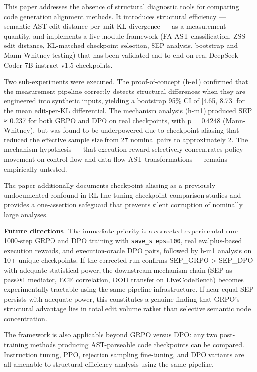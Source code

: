 
This paper addresses the absence of structural diagnostic tools for comparing code generation alignment methods. It introduces structural efficiency — semantic AST edit distance per unit KL divergence — as a measurement quantity, and implements a five-module framework (FA-AST classification, ZSS edit distance, KL-matched checkpoint selection, SEP analysis, bootstrap and Mann-Whitney testing) that has been validated end-to-end on real DeepSeek-Coder-7B-instruct-v1.5 checkpoints.

Two sub-experiments were executed. The proof-of-concept (h-e1) confirmed that the measurement pipeline correctly detects structural differences when they are engineered into synthetic inputs, yielding a bootstrap 95\% CI of [4.65, 8.73] for the mean edit-per-KL differential. The mechanism analysis (h-m1) produced SEP ≈ 0.237 for both GRPO and DPO on real checkpoints, with p = 0.4248 (Mann-Whitney), but was found to be underpowered due to checkpoint aliasing that reduced the effective sample size from 27 nominal pairs to approximately 2. The mechanism hypothesis — that execution reward selectively concentrates policy movement on control-flow and data-flow AST transformations — remains empirically untested.

The paper additionally documents checkpoint aliasing as a previously undocumented confound in RL fine-tuning checkpoint-comparison studies and provides a one-assertion safeguard that prevents silent corruption of nominally large analyses.

\textbf{Future directions.} The immediate priority is a corrected experimental run: 1000-step GRPO and DPO training with \texttt{save_steps=100}, real evalplus-based execution rewards, and execution-oracle DPO pairs, followed by h-m1 analysis on 10+ unique checkpoints. If the corrected run confirms SEP_GRPO > SEP_DPO with adequate statistical power, the downstream mechanism chain (SEP as pass@1 mediator, ECE correlation, OOD transfer on LiveCodeBench) becomes experimentally tractable using the same pipeline infrastructure. If near-equal SEP persists with adequate power, this constitutes a genuine finding that GRPO's structural advantage lies in total edit volume rather than selective semantic node concentration.

The framework is also applicable beyond GRPO versus DPO: any two post-training methods producing AST-parseable code checkpoints can be compared. Instruction tuning, PPO, rejection sampling fine-tuning, and DPO variants are all amenable to structural efficiency analysis using the same pipeline.
